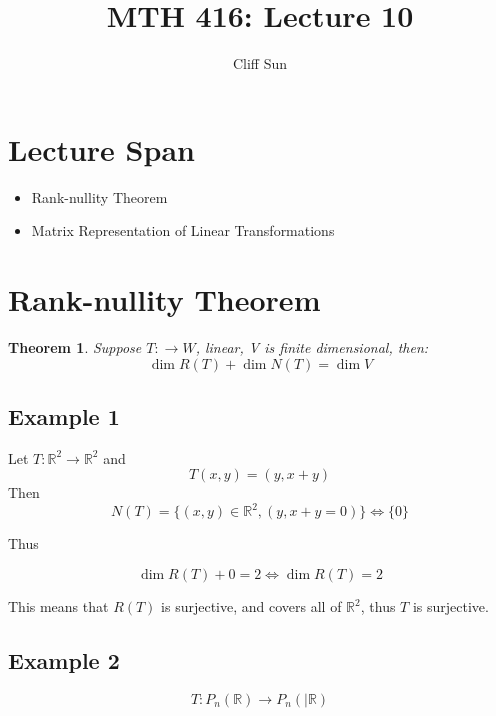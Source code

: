 \documentclass{article}
\title{MTH 416: Lecture 10}
\author{Cliff Sun}
\newtheorem{theorem}{Theorem}[section]
\newtheorem{one minute paper}[theorem]{One Minute Paper}
\begin{document}
\maketitle

\section*{Lecture Span}
\begin{itemize}
    \item Rank-nullity Theorem
    \item Matrix Representation of Linear Transformations
\end{itemize}

\section*{Rank-nullity Theorem}

\begin{theorem}
    Suppose $T: \rightarrow W$, linear, V is finite dimensional, then:
    \begin{equation}
        \dim R(T) + \dim N(T) = \dim V
    \end{equation}
\end{theorem}

\subsection*{Example 1}

Let $T: \mathbb{R}^2 \rightarrow \mathbb{R}^2$ and 
\begin{equation}
    T(x,y) = (y,x+y)
\end{equation}
Then 
\begin{equation}
    N(T) = \{(x,y) \in \mathbb{R}^2, (y,x+y = 0)\} \iff \{0\}
\end{equation}

Thus

\begin{equation}
    \dim R(T) + 0 = 2 \iff \dim R(T) = 2
\end{equation}

This means that $R(T)$ is surjective, and covers all of $\mathbb{R}^2$, thus $T$ is surjective. 

\subsection*{Example 2}

\begin{equation}
    T: P_n(\mathbb{R}) \rightarrow P_n(|\mathbb{R})
\end{equation}
\end{document}
